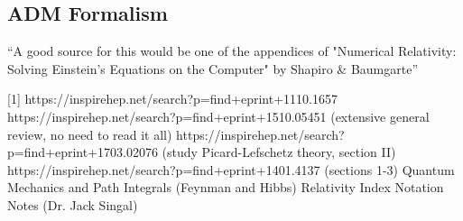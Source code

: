 \documentclass[12pt]{revtex4}
\begin{document}
\subsection{ADM Formalism} \label{ADM}
``A good source for this would be one of the appendices of "Numerical Relativity: Solving Einstein's Equations on the Computer" by Shapiro \& Baumgarte''

\begin{thebibliography}{}

[1] https://inspirehep.net/search?p=find+eprint+1110.1657 \newline
[2] https://inspirehep.net/search?p=find+eprint+1510.05451  (extensive general review, no need to read it all) \newline
[3] https://inspirehep.net/search?p=find+eprint+1703.02076   (study Picard-Lefschetz theory, section II) \newline
[4] https://inspirehep.net/search?p=find+eprint+1401.4137   (sections 1-3) \newline
[5] Quantum Mechanics and Path Integrals (Feynman and Hibbs) \newline
[6] Relativity Index Notation Notes (Dr. Jack Singal) \newline
[7] \newline
[8] \newline
\end{thebibliography}
\end{document}
